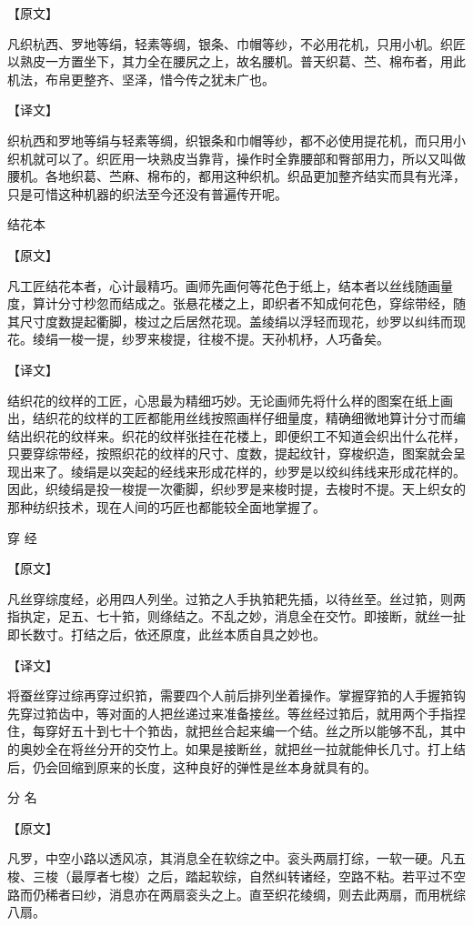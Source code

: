 \documentclass[12pt,UTF8]{ctexbook}
\begin{document}
【原文】

凡织杭西、罗地等绢，轻素等绸，银条、巾帽等纱，不必用花机，只用小机。织匠以熟皮一方置坐下，其力全在腰尻之上，故名腰机。普天织葛、苎、棉布者，用此机法，布帛更整齐、坚泽，惜今传之犹未广也。

【译文】

织杭西和罗地等绢与轻素等绸，织银条和巾帽等纱，都不必使用提花机，而只用小织机就可以了。织匠用一块熟皮当靠背，操作时全靠腰部和臀部用力，所以又叫做腰机。各地织葛、苎麻、棉布的，都用这种织机。织品更加整齐结实而具有光泽，只是可惜这种机器的织法至今还没有普遍传开呢。

结花本

【原文】

凡工匠结花本者，心计最精巧。画师先画何等花色于纸上，结本者以丝线随画量度，算计分寸杪忽而结成之。张悬花楼之上，即织者不知成何花色，穿综带经，随其尺寸度数提起衢脚，梭过之后居然花现。盖绫绢以浮轻而现花，纱罗以纠纬而现花。绫绢一梭一提，纱罗来梭提，往梭不提。天孙机杼，人巧备矣。

【译文】

结织花的纹样的工匠，心思最为精细巧妙。无论画师先将什么样的图案在纸上画出，结织花的纹样的工匠都能用丝线按照画样仔细量度，精确细微地算计分寸而编结出织花的纹样来。织花的纹样张挂在花楼上，即便织工不知道会织出什么花样，只要穿综带经，按照织花的纹样的尺寸、度数，提起纹针，穿梭织造，图案就会呈现出来了。绫绢是以突起的经线来形成花样的，纱罗是以绞纠纬线来形成花样的。因此，织绫绢是投一梭提一次衢脚，织纱罗是来梭时提，去梭时不提。天上织女的那种纺织技术，现在人间的巧匠也都能较全面地掌握了。

穿 经

【原文】

凡丝穿综度经，必用四人列坐。过筘之人手执筘耙先插，以待丝至。丝过筘，则两指执定，足五、七十筘，则绦结之。不乱之妙，消息全在交竹。即接断，就丝一扯即长数寸。打结之后，依还原度，此丝本质自具之妙也。

【译文】

将蚕丝穿过综再穿过织筘，需要四个人前后排列坐着操作。掌握穿筘的人手握筘钩先穿过筘齿中，等对面的人把丝递过来准备接丝。等丝经过筘后，就用两个手指捏住，每穿好五十到七十个筘齿，就把丝合起来编一个结。丝之所以能够不乱，其中的奥妙全在将丝分开的交竹上。如果是接断丝，就把丝一拉就能伸长几寸。打上结后，仍会回缩到原来的长度，这种良好的弹性是丝本身就具有的。

分 名

【原文】

凡罗，中空小路以透风凉，其消息全在软综之中。衮头两扇打综，一软一硬。凡五梭、三梭（最厚者七梭）之后，踏起软综，自然纠转诸经，空路不粘。若平过不空路而仍稀者曰纱，消息亦在两扇衮头之上。直至织花绫绸，则去此两扇，而用桄综八扇。
\end{document}
